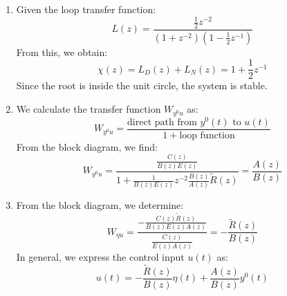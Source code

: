 \begin{enumerate}
\begin{figure}[H]
        \end{figure}
    \item Given the loop transfer function:
        \[L(z)=\dfrac{\frac{1}{2}z^{-2}}{\left(1+z^{-2}\right)\left(1-\frac{1}{2}z^{-1}\right)}\]
        From this, we obtain:
        \[\chi(z)=L_D(z)+L_N(z)=1+\dfrac{1}{2}z^{-1}\]
        Since the root is inside the unit circle, the system is stable.
    \item We calculate the transfer function $W_{y^0u}$ as:
        \[W_{y^0u}=\dfrac{\text{direct path from } y^0(t) \text{ to } u(t)}{1+\text{loop function}}\]
        From the block diagram, we find:
        \[W_{y^0u}=\dfrac{\frac{C(z)}{B(z)E(z)}}{1+\frac{1}{B(z)E(z)}z^{-2}\frac{B(z)}{A(z)}\tilde{R}(z)}=\dfrac{A(z)}{B(z)}\]
    \item From the block diagram, we determine:
        \[W_{\eta u}=\dfrac{-\frac{C(z)\tilde{R}(z)}{B(z)E(z)A(z)}}{\frac{C(z)}{E(z)A(z)}}=-\dfrac{\tilde{R}(z)}{B(z)}\]
        In general, we express the control input $u(t)$ as:
        \[u(t)=-\dfrac{\tilde{R}(z)}{B(z)}\eta(t)+\dfrac{A(z)}{B(z)}y^0(t)\]
\end{enumerate}